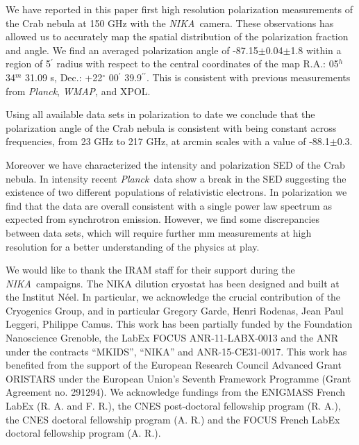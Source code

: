 \documentclass[twocolumn,traditabstract]{aa}
\def\NIKA{\textit{NIKA}}
\def\Planck{\textit{Planck}}
\def\WMAP{\textit{WMAP}}
\begin{document}
We have reported in this paper first high resolution polarization measurements of the Crab nebula at 150 GHz with the \NIKA\ camera. These observations has allowed us to accurately map the spatial distribution of the polarization fraction and angle. 
We find an averaged polarization angle of -87.15$\pm$0.04$\pm$1.8 within a region of 5$^\prime$ radius with respect to the central coordinates of the map R.A.: 05$^{h}$ 34$^{m}$ 31.09 s, Dec.: +22$^{\circ}$ 00$^{\prime}$ 39.9$^{\prime\prime}$.
This is consistent with previous measurements from \Planck, \WMAP, and XPOL.

Using all available data sets in polarization to date we conclude that the polarization angle of the Crab nebula is consistent with being constant across frequencies, from 23 GHz to 217 GHz, at arcmin scales with a value of -88.1$\pm$0.3. 

Moreover we have characterized the intensity and polarization SED of the Crab nebula. 
In intensity recent \Planck\ data show a break in the SED suggesting the existence of two different populations of relativistic electrons. In polarization we find that the data are overall consistent with a single power law spectrum as expected from synchrotron emission. However, we find some discrepancies between data sets, which will require further mm measurements at high resolution for a better understanding of the physics at play. 

\vspace{0.2cm}
 \begin{acknowledgements}
We would like to thank the IRAM staff for their support during the \NIKA\ campaigns. 
The NIKA dilution cryostat has been designed and built at the Institut N\'eel. 
In particular, we acknowledge the crucial contribution of the Cryogenics Group, and 
in particular Gregory Garde, Henri Rodenas, Jean Paul Leggeri, Philippe Camus. 
This work has been partially funded by the Foundation Nanoscience Grenoble, the LabEx FOCUS ANR-11-LABX-0013 and 
the ANR under the contracts ``MKIDS'', ``NIKA'' and ANR-15-CE31-0017. 
This work has benefited from the support of the European Research Council Advanced Grant ORISTARS 
under the European Union's Seventh Framework Programme (Grant Agreement no. 291294).
We acknowledge fundings from the ENIGMASS French LabEx (R. A. and F. R.), 
the CNES post-doctoral fellowship program (R. A.),  the CNES doctoral fellowship program (A. R.) and 
the FOCUS French LabEx doctoral fellowship program (A. R.).
\end{acknowledgements}



\end{document}
